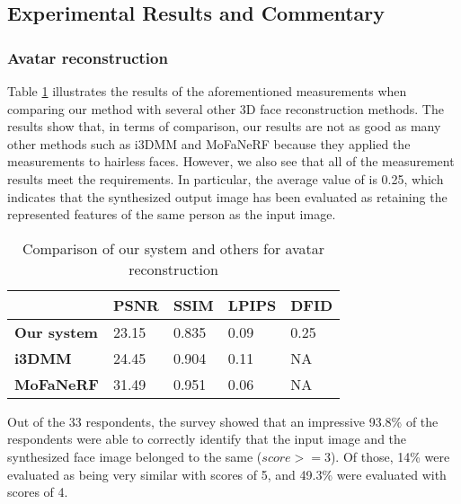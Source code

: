 \subsection{Experimental Results and Commentary}
\subsubsection{Avatar reconstruction}

Table \ref{loss_stats} illustrates the results of the aforementioned measurements when comparing our method with several other 3D face reconstruction methods. The results show that, in terms of comparison, our results are not as good as many other methods such as i3DMM and MoFaNeRF because they applied the measurements to hairless faces. However, we also see that all of the measurement results meet the requirements. In particular, the average value of  is 0.25, which indicates that the synthesized output image has been evaluated as retaining the represented features of the same person as the input image.

\begin{table}[H]
    \centering
    \captionsetup{font=bf}
    \caption{Comparison of our system and others for avatar reconstruction}
    \begin{tabularx}{\linewidth}{| X | X | X | X | X |}
        \hline
                            & \textbf{PSNR} & \textbf{SSIM} & \textbf{LPIPS} & \textbf{DFID} \\ \hline\hline
        \textbf{Our system} & 23.15         & 0.835         & 0.09           & 0.25          \\ \hline %
        \textbf{i3DMM}      & 24.45         & 0.904         & 0.11           & NA            \\ \hline
        \textbf{MoFaNeRF}   & 31.49         & 0.951         & 0.06           & NA            \\ \hline
    \end{tabularx}
    \label{loss_stats}
\end{table}

Out of the 33 respondents, the survey showed that an impressive 93.8\% of the respondents were able to correctly identify that the input image and the synthesized face image belonged to the same  ($score >= 3$). Of those, 14\% were evaluated as being very similar with scores of 5, and 49.3\% were evaluated with scores of 4. %


